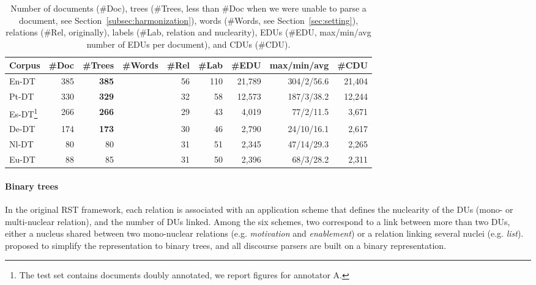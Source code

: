 \documentclass[11pt]{article}
\newcommand{\erstdt}{En-DT}
\newcommand{\derst}{De-DT}
\newcommand{\ptrst}{Pt-DT}
\newcommand{\barst}{Eu-DT}
\newcommand{\sprst}{Es-DT}
\newcommand{\nlrst}{Nl-DT}
\newcommand{\rel}[1]{\textit{#1}}
\begin{document}
\begin{table*}[ht!]
\begin{tabular}{lrrrrrrrr}
\toprule
Corpus              & \#Doc         & \#Trees   & \#Words          & \#Rel & \#Lab  & \#EDU  & max/min/avg & \#CDU  \\
\midrule
\erstdt 			& 385           & {\bf 385}       &          &56&  110 & 21,789 & 304/2/56.6   & 21,404  \\
\ptrst 				& 330 			& {\bf 329} 		& 	& 32 &  58	& 12,573 & 187/3/38.2 & 12,244 \\
\sprst\footnote{The test set contains  documents doubly annotated, we report figures for annotator A. 
}
                    & 266           & {\bf 266}       &           & 29    &  43       & 4,019 & 77/2/11.5     &  3,671  \\
\derst 				& 174           & {\bf 173}       &           & 30    &  46       & 2,790 & 24/10/16.1    & 2,617  \\
\nlrst              & 80            & 80        &           & 31    &  51       & 2,345 & 47/14/29.3    &  2,265  \\
\barst  		    & 88            & 85        &           & 31    &  50       & 2,396 & 68/3/28.2     & 2,311   \\
\bottomrule
\end{tabular}
\caption{Number of documents (\#Doc), trees (\#Trees, less than \#Doc when we were unable to parse a document, see Section~\ref{subsec:harmonization}), words (\#Words, see Section~\ref{sec:setting}), relations (\#Rel, originally), labels (\#Lab, relation and nuclearity), EDUs (\#EDU, max/min/avg number of EDUs per document), and CDUs (\#CDU).
}
\label{table:stats}
\end{table*}



\paragraph{Binary trees}
In the original RST framework, each relation is associated with an application scheme that defines the nuclearity of the DUs (mono- or multi-nuclear relation), and the number of DUs linked.
Among the six schemes, two correspond to a link between more than two DUs, either a nucleus shared between two mono-nuclear relations (e.g. \rel{motivation} and \rel{enablement}) or a relation linking several nuclei (e.g. \rel{list}). 
 proposed to simplify the representation to binary trees, and all discourse parsers are built on a binary representation. 
\end{document}
